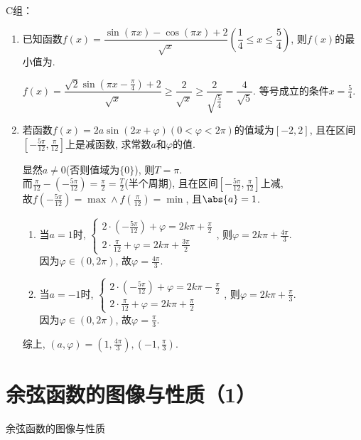 C组：
\begin{enumerate}
    \item 已知函数$f(x)=\dfrac{\sin(\pi x)-\cos(\pi x)+2}{\sqrt{x}}\left(\dfrac{1}{4}\leq x\leq \dfrac{5}{4}\right)$, 则$f(x)$的最小值为. 
    \begin{jieda}
    $f(x)=\dfrac{\sqrt{2}\sin(\pi{x}-\frac{\pi}{4})+2}{\sqrt{x}}\geq\dfrac{2}{\sqrt{x}}\geq\dfrac{2}{\sqrt{\frac{5}{4}}}=\dfrac{4}{\sqrt{5}}$. 
    等号成立的条件$x=\frac{5}{4}$. 
    \end{jieda}
    \item 若函数$f(x)=2a\sin(2x+\varphi)\left(0<\varphi<2\pi\right)$的值域为$[-2,2]$, 且在区间$\left[-\frac{5\pi}{12},\frac{\pi}{12}\right]$上是减函数, 
    求常数$a$和$\varphi$的值. 
    \begin{jieda}
    显然$a\neq 0$(否则值域为$\{0\}$), 则$T=\pi$. \\
    而$\frac{\pi}{12}-(-\frac{5\pi}{12})=\frac{\pi}{2}=\frac{T}{2}$(半个周期), 且在区间$\left[-\frac{5\pi}{12},\frac{\pi}{12}\right]$上减, \\
    故$f(-\frac{5\pi}{12})=\max\land f(\frac{\pi}{12})=\min$, 且$\abs{a}=1$. 
    \begin{enumerate}[(1)]
    \item 当$a=1$时, $\begin{cases}
    2\cdot(-\frac{5\pi}{12})+\varphi=2k\pi+\frac{\pi}{2}\\
    2\cdot\frac{\pi}{12}+\varphi=2k\pi+\frac{3\pi}{2}
    \end{cases}$, 
    则$\varphi=2k\pi+\frac{4\pi}{3}$. \\
    因为$\varphi\in(0,2\pi)$, 故$\varphi=\frac{4\pi}{3}$. 
    
    \item 当$a=-1$时, $\begin{cases}
    2\cdot(-\frac{5\pi}{12})+\varphi=2k\pi-\frac{\pi}{2}\\
    2\cdot\frac{\pi}{12}+\varphi=2k\pi+\frac{\pi}{2}
    \end{cases}$, 
    则$\varphi=2k\pi+\frac{\pi}{3}$. \\
    因为$\varphi\in(0,2\pi)$, 故$\varphi=\frac{\pi}{3}$. 
    \end{enumerate}
    
    综上, $(a,\varphi)=(1,\frac{4\pi}{3}),(-1,\frac{\pi}{3})$. 
    \end{jieda}
\end{enumerate}


\section{余弦函数的图像与性质（1）}
\zsd 余弦函数的图像与性质 \\

